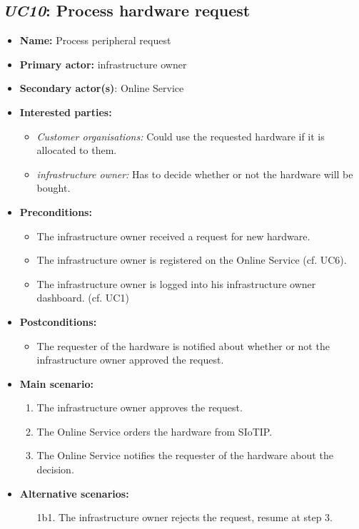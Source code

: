 \documentclass[english]{sareport}
\begin{document}
\subsection{\emph{UC10}: Process hardware request}
\begin{itemize}
    \item \textbf{Name:} Process peripheral request
    \item \textbf{Primary actor:} infrastructure owner
    \item \textbf{Secondary actor(s)}: Online Service
    \item \textbf{Interested parties:} 
        \begin{itemize}
            \item \textit{Customer organisations:} Could use the requested hardware if it is allocated to them.
            \item \textit{infrastructure owner:} Has to decide whether or not the hardware will be bought.
        \end{itemize}

    \item \textbf{Preconditions:}
        \begin{itemize}
            \item The infrastructure owner received a request for new hardware.
            \item The infrastructure owner is registered on the Online Service (cf. UC6).
            \item The infrastructure owner is logged into his infrastructure owner dashboard. (cf. UC1)
        \end{itemize}

    \item \textbf{Postconditions:}
        \begin{itemize}
            \item The requester of the hardware is notified about whether or not the infrastructure owner approved the request.
        \end{itemize}
        
    \item \textbf{Main scenario:} 
    \begin{enumerate}
       \item The infrastructure owner approves the request.
       \item The Online Service orders the hardware from SIoTIP.
       \item The Online Service notifies the requester of the hardware about the decision.
    \end{enumerate}

    \item \textbf{Alternative scenarios:} 
    \begin{enumerate}
        \item [1b1.] The infrastructure owner rejects the request, resume at step 3.
    \end{enumerate}
\end{itemize}
\end{document}
